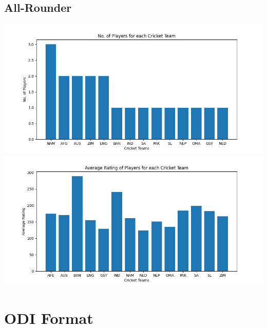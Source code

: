 \documentclass{article}
\begin{document}
\begin{normalsize}
            \subsection{All-Rounder}\label{subsec:all-rounder1}
                \includegraphics[scale=0.75]{t20i_all-rounder_3-10-2023-1}
                \includegraphics[scale=0.75]{t20i_all-rounder_3-10-2023-2}

        \vspace{2em}

        \section{ODI Format}\label{sec:odi-format}

\end{normalsize}
\end{document}
